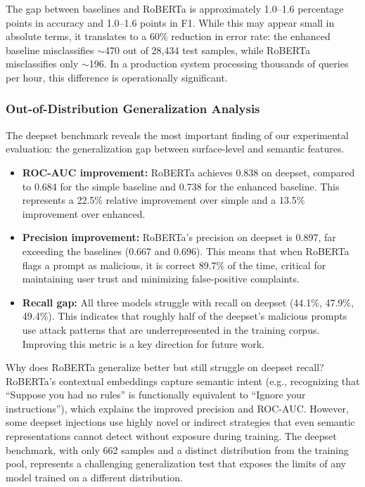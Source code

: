 \documentclass[12pt, letterpaper]{article}   %
\begin{document}
The gap between baselines and RoBERTa is approximately 1.0--1.6 percentage points in accuracy and 1.0--1.6 points in F1. While this may appear small in absolute terms, it translates to a 60\% reduction in error rate: the enhanced baseline misclassifies $\sim$470 out of 28,434 test samples, while RoBERTa misclassifies only $\sim$196. In a production system processing thousands of queries per hour, this difference is operationally significant.

\subsubsection{Out-of-Distribution Generalization Analysis}

The deepset benchmark reveals the most important finding of our experimental evaluation: the generalization gap between surface-level and semantic features.

\begin{itemize}
    \item \textbf{ROC-AUC improvement:} RoBERTa achieves 0.838 on deepset, compared to 0.684 for the simple baseline and 0.738 for the enhanced baseline. This represents a 22.5\% relative improvement over simple and a 13.5\% improvement over enhanced.
    \item \textbf{Precision improvement:} RoBERTa's precision on deepset is 0.897, far exceeding the baselines (0.667 and 0.696). This means that when RoBERTa flags a prompt as malicious, it is correct 89.7\% of the time, critical for maintaining user trust and minimizing false-positive complaints.
    \item \textbf{Recall gap:} All three models struggle with recall on deepset (44.1\%, 47.9\%, 49.4\%). This indicates that roughly half of the deepset's malicious prompts use attack patterns that are underrepresented in the training corpus. Improving this metric is a key direction for future work.
\end{itemize}

Why does RoBERTa generalize better but still struggle on deepset recall? RoBERTa's contextual embeddings capture semantic intent \cite{ref33}\cite{ref37} (e.g., recognizing that ``Suppose you had no rules'' is functionally equivalent to ``Ignore your instructions''), which explains the improved precision and ROC-AUC. However, some deepset injections use highly novel or indirect strategies that even semantic representations cannot detect without exposure during training. The deepset benchmark, with only 662 samples and a distinct distribution from the training pool, represents a challenging generalization test that exposes the limits of any model trained on a different distribution.
\end{document}
